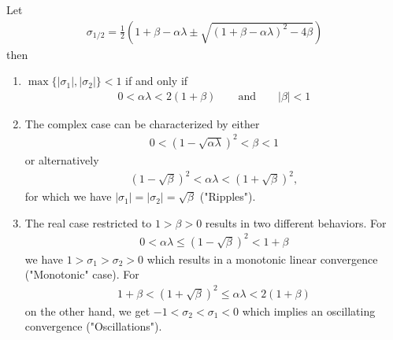 \begin{theorem}
	Let
	\begin{align*}
		\sigma_{1/2}
		= \tfrac12 \left(
			1+\beta-\alpha\lambda \pm \sqrt{(1+\beta-\alpha\lambda)^2 - 4\beta}
		\right)
	\end{align*}
	then 
	\begin{enumerate}
		\item \(\max\{|\sigma_1|,|\sigma_2|\}<1\) if and only if
		\begin{align*}
			0<\alpha\lambda < 2(1+\beta) \qquad \text{and} \qquad |\beta|<1
		\end{align*}
		\item The complex case can be characterized by either
		\begin{align*}
			0<(1-\sqrt{\alpha\lambda})^2 < \beta < 1
		\end{align*}		
		or alternatively
		\begin{align*}
			(1-\sqrt{\beta})^2 < \alpha\lambda < (1+\sqrt{\beta})^2,
		\end{align*}
		for which we have \(|\sigma_1|=|\sigma_2|=\sqrt{\beta}\) ("Ripples").
		\item The real case restricted to \(1>\beta>0\) results in two different	
		behaviors. For
		\begin{align*}
			0<\alpha\lambda \le (1-\sqrt{\beta})^2 < 1+\beta
		\end{align*}
		we have \(1>\sigma_1 > \sigma_2 > 0\) which results in a monotonic
		linear convergence ("Monotonic" case). For
		\begin{align*}
			1+\beta < (1+\sqrt{\beta})^2\le \alpha\lambda < 2(1+\beta)
		\end{align*}
		on the other hand, we get \(-1 < \sigma_2 < \sigma_1 < 0\) which implies 
		an oscillating convergence ("Oscillations").
	\end{enumerate}
\end{theorem}
